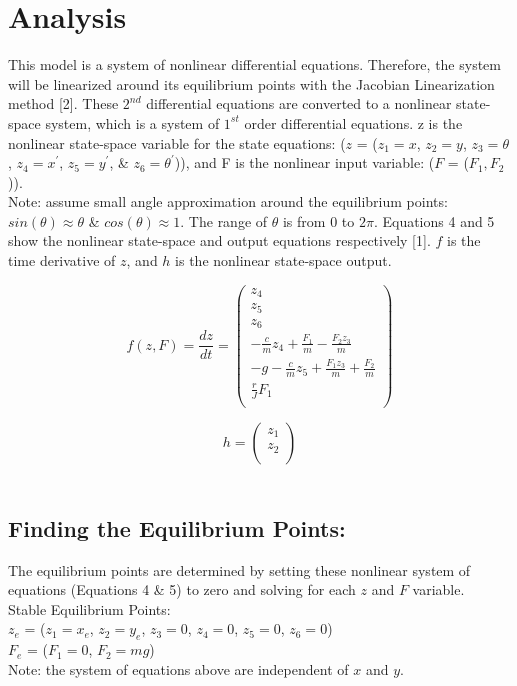 \documentclass[conference]{IEEEtran}
\begin{document}
\newpage
\section{Analysis}
This model is a system of nonlinear differential equations. Therefore, the system will be linearized around its equilibrium points with the Jacobian Linearization method [2]. These $2^{nd}$ differential equations are converted to a nonlinear state-space system, which is a system of $1^{st}$  order differential equations. z is the nonlinear state-space variable for the state equations: ($z$ = ($z_1 = x$, $z_2 = y$, $z_3 = \theta$, $z_4 = x^\prime$, $z_5 = y^\prime$, \& $z_6 = \theta^\prime$)), and F is the nonlinear input variable: ($F$ = ($F_1,F_2$)).\\

Note: assume small angle approximation around the equilibrium points: $sin(\theta) \approx \theta$ \& $cos(\theta) \approx 1$. The range of $\theta$ is from 0 to $2\pi$. Equations 4 and 5 show the nonlinear state-space and output equations respectively [1]. $f$ is the time derivative of $z$, and $h$ is the nonlinear state-space output.

\[
f(z,F) = \frac{dz}{dt} =
\begin{pmatrix}
z_4\\
z_5\\
z_6 \\
-\frac{c}{m}z_4 + \frac{F_1}{m} -\frac{F_2z_3}{m}\\
-g - \frac{c}{m}z_5 + \frac{F_1z_3}{m} +\frac{F_2}{m}\\
\frac{r}{J}F_1\\
\end{pmatrix}  
\tag{4}
\]

\[
h = 
\begin{pmatrix}
z_1\\
z_2\\
\end{pmatrix}
\tag{5}
\]\\

\subsection{Finding the Equilibrium Points:}
The equilibrium points are determined by setting these nonlinear system of equations (Equations 4 \& 5) to zero and solving for each $z$ and $F$ variable. \\

\noindent Stable Equilibrium Points: \\
\indent $z_e$ = ($z_1 = x_e$, $z_2 = y_e$, $z_3 = 0$, $z_4 = 0$, $z_5 = 0$, $z_6 = 0$)\\
\indent $F_e$ = ($F_1 = 0$, $F_2 = mg$)\\
Note: the system of equations above are independent of $x$ and $y$. \\
\end{document}
